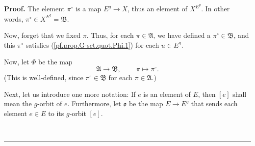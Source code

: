 \documentclass[numbers=enddot,12pt,final,onecolumn,notitlepage,abstracton]{scrartcl}
\theoremstyle{definition}
\newenvironment{proof}[1][Proof]{\noindent\textbf{#1.} }{\ \rule{0.5em}{0.5em}}
\newenvironment{verlong}{}{}
\begin{document}
\begin{verlong}
\begin{proof}
The element $\pi^{\circ}$ is a map $E^{g}\rightarrow X$, thus an element of
$X^{E^{g}}$. In other words, $\pi^{\circ}\in X^{E^{g}}=\mathfrak{B}$.

Now, forget that we fixed $\pi$. Thus, for each $\pi\in\mathfrak{A}$, we have
defined a $\pi^{\circ}\in\mathfrak{B}$, and this $\pi^{\circ}$ satisfies
(\ref{pf.prop.G-set.quot.Phi.1}) for each $u\in E^{g}$.

Now, let $\Phi$ be the map%
\[
\mathfrak{A}\rightarrow\mathfrak{B},\ \ \ \ \ \ \ \ \ \ \pi\mapsto\pi^{\circ}.
\]
(This is well-defined, since $\pi^{\circ}\in\mathfrak{B}$ for each $\pi
\in\mathfrak{A}$.)

Next, let us introduce one more notation: If $e$ is an element of $E$, then
$\left[  e\right]  $ shall mean the $g$-orbit of $e$. Furthermore, let
$\mathfrak{o}$ be the map $E\rightarrow E^{g}$ that sends each element $e\in
E$ to its $g$-orbit $\left[  e\right]  $.


\end{proof}
\end{verlong}
\end{document}
